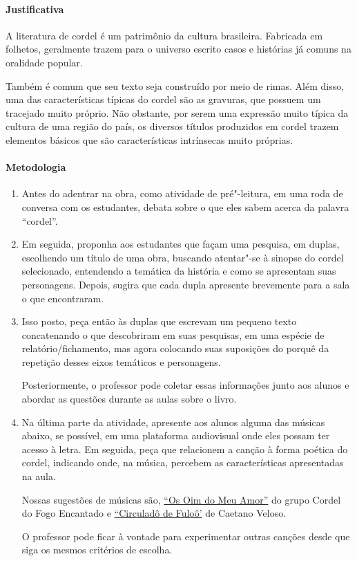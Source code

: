 \documentclass[12pt]{extarticle}
\begin{document}
\paragraph{Justificativa} A literatura de
cordel é um patrimônio da cultura brasileira. Fabricada em folhetos,
geralmente trazem para o universo escrito casos e histórias já comuns na
oralidade popular.

Também é comum que seu texto seja construído por meio
de rimas. Além disso, uma das características típicas do cordel são as
gravuras, que possuem um tracejado muito próprio. Não obstante, por
serem uma expressão muito típica da cultura de uma região do país, os
diversos títulos produzidos em cordel trazem elementos básicos que são
características intrínsecas muito próprias.

\paragraph{Metodologia}

\begin{enumerate}
\item
Antes do adentrar na obra, como atividade de pré"-leitura,
em uma roda de conversa com os estudantes, debata sobre o que eles 
sabem acerca da palavra ``cordel''.  

\item
Em seguida, proponha aos estudantes que façam uma pesquisa, em duplas, 
escolhendo um título de uma obra, buscando atentar"-se à sinopse do cordel selecionado, entendendo a temática da história e como se apresentam suas 
personagens. Depois, sugira que cada dupla apresente brevemente para a 
sala o que encontraram. 

\item
Isso posto, peça então às duplas que escrevam um pequeno texto 
concatenando o que descobriram em suas pesquisas, em uma espécie de 
relatório/fichamento, mas agora colocando suas suposições do 
porquê da repetição desses eixos temáticos e personagens. 

Posteriormente, o professor pode coletar essas informações
junto aos alunos e abordar as questões durante as aulas sobre o livro.

\item
Na última parte da atividade, apresente aos alunos alguma das músicas 
abaixo, se possível, em uma plataforma audiovisual onde eles possam ter 
acesso à letra. 
Em seguida, peça que relacionem a canção à forma poética do cordel, 
indicando onde, na música, percebem as características apresentadas na aula. 

Nossas sugestões de músicas são, \href{https://www.youtube.com/watch?v=S1eE0lGpi-c&ab_channel=CordeldoFogoEncantado}{``Os Oim do Meu Amor''} 
do grupo Cordel do Fogo Encantado e \href{https://www.youtube.com/watch?v=pPmQYbTE21M&ab_channel=CaetanoVeloso-Topic}{``Circuladô de Fuloô'} de Caetano Veloso.

O professor pode ficar à vontade para experimentar outras canções desde 
que siga os mesmos critérios de escolha. 


\end{enumerate}
\end{document}
